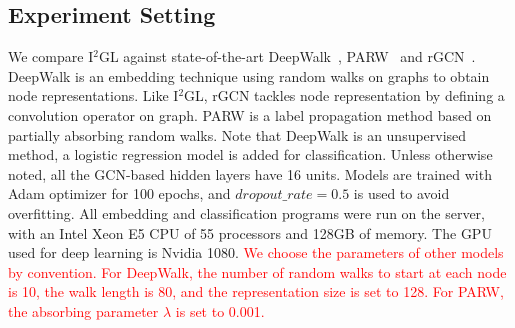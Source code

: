 \subsection{Experiment Setting}
We compare I$^2$GL against state-of-the-art DeepWalk~\cite{perozzi2014deepwalk}, PARW~\cite{wu2012learning} and rGCN~\cite{schlichtkrull2018modeling}. DeepWalk is an embedding technique using random walks on graphs to obtain node representations. Like I$^2$GL, rGCN tackles node representation by defining a convolution operator on graph. PARW is a label propagation method based on partially absorbing random walks. Note that DeepWalk is an unsupervised method, a logistic regression model is added for classification. Unless otherwise noted, all the GCN-based hidden layers have 16 units. Models are trained with Adam optimizer for 100 epochs, and $dropout\_rate=0.5$ is used to avoid overfitting. All embedding and classification programs were run on the server, with an Intel Xeon E5 CPU of 55 processors and 128GB of memory. The GPU used for deep learning is Nvidia 1080.
\textcolor{red}{We choose the parameters of other models by convention. For DeepWalk, the number of random walks to start at each node is 10, the walk length is 80, and the representation size is set to 128. For PARW, the absorbing parameter $\lambda$ is set to 0.001.}

